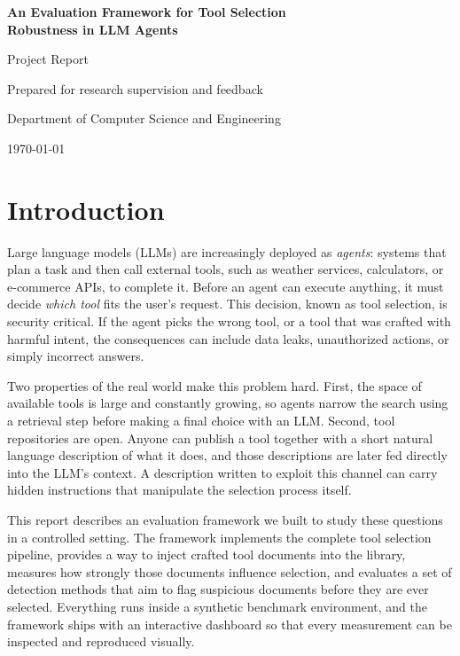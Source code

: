 \documentclass[11pt,a4paper]{report}
\begin{document}
\begin{titlepage}
  \centering
  {\LARGE\bfseries An Evaluation Framework for Tool Selection\\[2mm]
  Robustness in LLM Agents\par}
  \vspace{1.2cm}
  {\large Project Report\par}
  \vspace{0.6cm}
  {\large Prepared for research supervision and feedback\par}
  \vfill
  {\large Department of Computer Science and Engineering\par}
  \vspace{0.4cm}
  {\large \today\par}
\end{titlepage}

\tableofcontents

\chapter{Introduction}

Large language models (LLMs) are increasingly deployed as \emph{agents}:
systems that plan a task and then call external tools, such as weather
services, calculators, or e-commerce APIs, to complete it. Before an agent
can execute anything, it must decide \emph{which tool} fits the user's
request. This decision, known as tool selection, is security critical. If
the agent picks the wrong tool, or a tool that was crafted with harmful
intent, the consequences can include data leaks, unauthorized actions, or
simply incorrect answers.

Two properties of the real world make this problem hard. First, the space
of available tools is large and constantly growing, so agents narrow the
search using a retrieval step before making a final choice with an LLM.
Second, tool repositories are open. Anyone can publish a tool together
with a short natural language description of what it does, and those
descriptions are later fed directly into the LLM's context. A description
written to exploit this channel can carry hidden instructions that
manipulate the selection process itself.

This report describes an evaluation framework we built to study these
questions in a controlled setting. The framework implements the complete
tool selection pipeline, provides a way to inject crafted tool documents
into the library, measures how strongly those documents influence
selection, and evaluates a set of detection methods that aim to flag
suspicious documents before they are ever selected. Everything runs
inside a synthetic benchmark environment, and the framework ships with an
interactive dashboard so that every measurement can be inspected and
reproduced visually.
\end{document}
